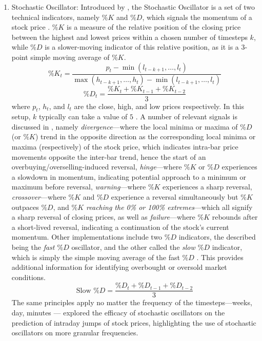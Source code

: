 \documentclass[stu,floatsintext]{apa7}
\begin{document}
\begin{enumerate}
\item Stochastic Oscillator: Introduced by \textcite{lane1984lanes}, the Stochastic Oscillator is a set of two technical indicators, namely $\%K$ and $\%D$, which signals the momentum of a stock price \parencite{thorp2000iding}. $\%K$ is a measure of the relative position of the closing price between the highest and lowest prices within a chosen number of timesteps $k$, while $\%D$ is a slower-moving indicator of this relative position, as it is a $3$-point simple moving average of $\%K$.
\begin{equation}\%K_t=\frac{p_t-\min(l_{t-k+1},\dots,l_t)}{\max(h_{t-k+1},\dots,h_t)-\min(l_{t-k+1},\dots,l_t)}\end{equation}
\begin{equation}\%D_t=\frac{\%K_{t}+\%K_{t-1}+\%K_{t-2}}{3}\end{equation}
where $p_t$, $h_t$, and $l_t$ are the close, high, and low prices respectively. In this setup, $k$ typically can take a value of $5$ \parencite{thorp2000iding}. A number of relevant signals is discussed in \parencite{lane1984lanes}, namely \textit{divergence}—where the local minima or maxima of $\%D$ (or $\%K$) trend in the opposite direction as the corresponding local minima or maxima (respectively) of the stock price, which indicates intra-bar price movements opposite the inter-bar trend, hence the start of an overbuying/overselling-induced reversal, \textit{hinge}—where $\%K$ or $\%D$ experiences a slowdown in momentum, indicating potential approach to a minimum or maximum before reversal, \textit{warning}—where $\%K$ experiences a sharp reversal, \textit{crossover}—where $\%K$ and $\%D$ experience a reversal simultaneously but $\%K$ outpaces $\%D$, and \textit{$\%K$ reaching the 0\% or 100\% extremes}—which all signify a sharp reversal of closing prices, as well as \textit{failure}—where $\%K$ rebounds after a short-lived reversal, indicating a continuation of the stock’s current momentum. Other implementations include two $\%D$ indicators, the described being the \textit{fast $\%D$} oscillator, and the other called the \textit{slow $\%D$} indicator, which is simply the simple moving average of the fast $\%D$ \parencite{kong2020predicting}. This provides additional information for identifying overbought or oversold market conditions.
\begin{equation}\text{Slow }\%D=\frac{\%D_t+\%D_{t-1}+\%D_{t-2}}{3}\end{equation}
The same principles apply no matter the frequency of the timesteps—weeks, day, minutes \parencite{thorp2000iding}—\textcite{kong2020predicting} explored the efficacy of stochastic oscillators on the prediction of intraday jumps of stock prices, highlighting the use of stochastic oscillators on more granular frequencies.

\end{enumerate}
\end{document}
